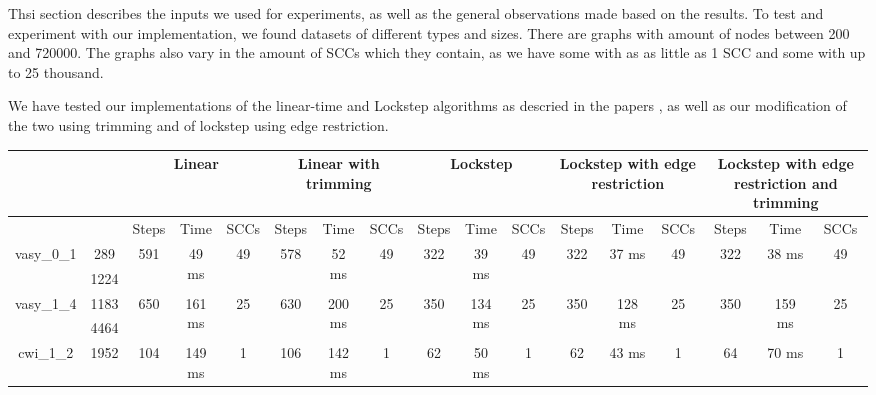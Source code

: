 \documentclass[../master/master.tex]{subfiles}
\begin{document}
Thsi section describes the inputs we used for experiments, as well as the general observations made based on the results. To test and experiment with our implementation, we found datasets of different types and sizes. There are graphs with amount of nodes between 200 and 720000. The graphs also vary in the amount of SCCs which they contain, as we have some with as as little as 1 SCC and some with up to 25 thousand.

We have tested our implementations of the linear-time and Lockstep algorithms as descried in the papers \cite{linear}\cite{lockstep}, as well as our modification of the two using trimming and of lockstep using edge restriction.

\begin{center}
\begin{tabular}{ |c|c||c|c|c||c|c|c||c|c|c||c|c|c||c|c|c| } 
\hline
 \multicolumn{2}{|c||}{} & \multicolumn{3}{c||}{Linear} & \multicolumn{3}{c||}{Linear with trimming} & \multicolumn{3}{c||}{Lockstep} & \multicolumn{3}{c||}{Lockstep with edge restriction} & \multicolumn{3}{c||}{Lockstep with edge restriction and trimming}\\
\hline
\multicolumn{2}{|c||}{}& Steps & Time & SCCs& Steps & Time & SCCs& Steps & Time & SCCs& Steps & Time & SCCs& Steps & Time & SCCs\\
\hline
\multirow{2}{4em}{vasy\_0\_1} & 289 & \multirow{2}{4em}{591} & \multirow{2}{4em}{49 ms} & \multirow{2}{4em}{49} & \multirow{2}{4em}{578} & \multirow{2}{4em}{52 ms} & \multirow{2}{4em}{49} & \multirow{2}{4em}{322} & \multirow{2}{4em}{39 ms} & \multirow{2}{4em}{49} & \multirow{2}{4em}{322} & \multirow{2}{4em}{37 ms} & \multirow{2}{4em}{49} & \multirow{2}{4em}{322} & \multirow{2}{4em}{38 ms} & \multirow{2}{4em}{49} \\
\cline{2-2}
 & 1224  &  &  &  &  &  &  &  &  &  &  &  &  &  &  &  \\
\hline
\multirow{2}{4em}{vasy\_1\_4} & 1183 & \multirow{2}{4em}{650} & \multirow{2}{4em}{161 ms} & \multirow{2}{4em}{25} & \multirow{2}{4em}{630} & \multirow{2}{4em}{200 ms} & \multirow{2}{4em}{25} & \multirow{2}{4em}{350} & \multirow{2}{4em}{134 ms} & \multirow{2}{4em}{25} & \multirow{2}{4em}{350} & \multirow{2}{4em}{128 ms} & \multirow{2}{4em}{25} & \multirow{2}{4em}{350} & \multirow{2}{4em}{159 ms} & \multirow{2}{4em}{25} \\
\cline{2-2}
 & 4464  &  &  &  &  &  &  &  &  &  &  &  &  &  &  &  \\
\hline
\multirow{2}{4em}{cwi\_1\_2} & 1952 & \multirow{2}{4em}{104} & \multirow{2}{4em}{149 ms} & \multirow{2}{4em}{1} & \multirow{2}{4em}{106} & \multirow{2}{4em}{142 ms} & \multirow{2}{4em}{1} & \multirow{2}{4em}{62} & \multirow{2}{4em}{50 ms} & \multirow{2}{4em}{1} & \multirow{2}{4em}{62} & \multirow{2}{4em}{43 ms} & \multirow{2}{4em}{1} & \multirow{2}{4em}{64} & \multirow{2}{4em}{70 ms} & \multirow{2}{4em}{1} \\

\end{tabular}
\end{center}
\end{document}
